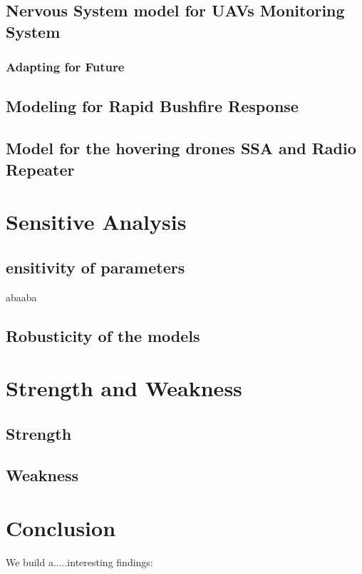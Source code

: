 \documentclass[13pt]{ctexart} %
\begin{document}
\subsection{Nervous System model for UAVs Monitoring System}


\subsubsection{Adapting for Future}


\subsection{Modeling for Rapid Bushfire Response}


\subsection{Model for the hovering drones SSA and Radio Repeater}


\section{Sensitive Analysis}
\subsection{ensitivity of parameters}
abaaba
\subsection{Robusticity of the models}

\section{Strength and Weakness}
\subsection{Strength}


\subsection{Weakness}


\section{Conclusion}
We build a.....interesting findings:
\end{document}
